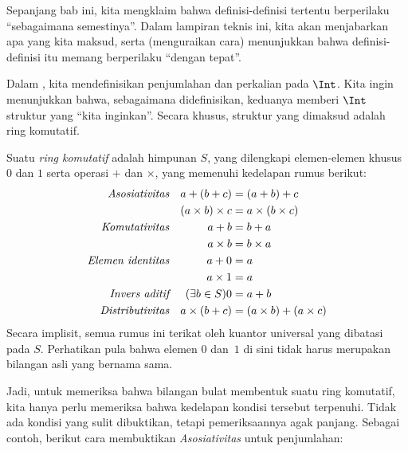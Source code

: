 \documentclass[../../../include/open-logic-section]{subfiles}
\begin{document}
	

Sepanjang bab ini, kita mengklaim bahwa definisi-definisi tertentu berperilaku
``sebagaimana semestinya''. Dalam lampiran teknis ini, kita akan menjabarkan
apa yang kita maksud, serta (menguraikan cara) menunjukkan bahwa
definisi-definisi itu memang berperilaku ``dengan tepat''.

Dalam , kita mendefinisikan penjumlahan dan perkalian pada
$\Int$. Kita ingin menunjukkan bahwa, sebagaimana didefinisikan, keduanya
memberi $\Int$ struktur yang ``kita inginkan''. Secara khusus, struktur yang
dimaksud adalah ring komutatif.

\begin{defn}
	Suatu \emph{ring komutatif} adalah himpunan $S$, yang dilengkapi elemen-elemen khusus $0$ dan $1$ serta operasi $+$ dan $\times$, yang memenuhi kedelapan rumus berikut:
	\begin{align*}
		\emph{Asosiativitas}&&a + (b+ c) & = (a + b) + c \\
		&& (a \times b) \times c & = a \times (b\times c)\\
		\emph{Komutativitas}&&a + b &= b+ a  \\
		&&  a \times b&= b\times a\\ 
		\emph{Elemen identitas}&&a + 0 &= a \\
		&& a \times 1 &= a\\
		\emph{Invers aditif}&&(\exists b\in S)0&=a + b\\
		\emph{Distributivitas}&&a \times (b+ c ) &= (a \times b) + (a \times c)
	\end{align*}
	Secara implisit, semua rumus ini terikat oleh kuantor universal yang dibatasi pada $S$. Perhatikan pula bahwa elemen $0$ dan~$1$ di sini tidak harus merupakan bilangan asli yang bernama sama.
\end{defn}

Jadi, untuk memeriksa bahwa bilangan bulat membentuk suatu ring komutatif,
kita hanya perlu memeriksa bahwa kedelapan kondisi tersebut terpenuhi. Tidak
ada kondisi yang {sulit} dibuktikan, tetapi pemeriksaannya agak panjang.
Sebagai contoh, berikut cara membuktikan \emph{Asosiativitas} untuk
penjumlahan:
\end{document}
